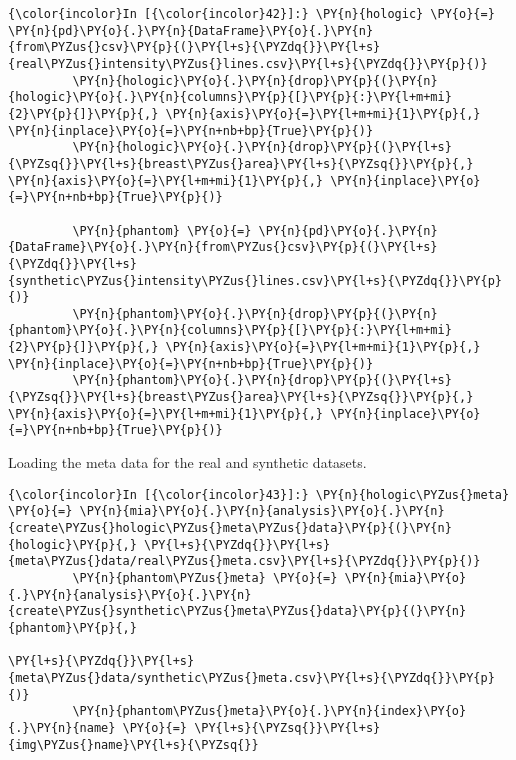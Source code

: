     \begin{Verbatim}[commandchars=\\\{\}]
{\color{incolor}In [{\color{incolor}42}]:} \PY{n}{hologic} \PY{o}{=} \PY{n}{pd}\PY{o}{.}\PY{n}{DataFrame}\PY{o}{.}\PY{n}{from\PYZus{}csv}\PY{p}{(}\PY{l+s}{\PYZdq{}}\PY{l+s}{real\PYZus{}intensity\PYZus{}lines.csv}\PY{l+s}{\PYZdq{}}\PY{p}{)}
         \PY{n}{hologic}\PY{o}{.}\PY{n}{drop}\PY{p}{(}\PY{n}{hologic}\PY{o}{.}\PY{n}{columns}\PY{p}{[}\PY{p}{:}\PY{l+m+mi}{2}\PY{p}{]}\PY{p}{,} \PY{n}{axis}\PY{o}{=}\PY{l+m+mi}{1}\PY{p}{,} \PY{n}{inplace}\PY{o}{=}\PY{n+nb+bp}{True}\PY{p}{)}
         \PY{n}{hologic}\PY{o}{.}\PY{n}{drop}\PY{p}{(}\PY{l+s}{\PYZsq{}}\PY{l+s}{breast\PYZus{}area}\PY{l+s}{\PYZsq{}}\PY{p}{,} \PY{n}{axis}\PY{o}{=}\PY{l+m+mi}{1}\PY{p}{,} \PY{n}{inplace}\PY{o}{=}\PY{n+nb+bp}{True}\PY{p}{)}

         \PY{n}{phantom} \PY{o}{=} \PY{n}{pd}\PY{o}{.}\PY{n}{DataFrame}\PY{o}{.}\PY{n}{from\PYZus{}csv}\PY{p}{(}\PY{l+s}{\PYZdq{}}\PY{l+s}{synthetic\PYZus{}intensity\PYZus{}lines.csv}\PY{l+s}{\PYZdq{}}\PY{p}{)}
         \PY{n}{phantom}\PY{o}{.}\PY{n}{drop}\PY{p}{(}\PY{n}{phantom}\PY{o}{.}\PY{n}{columns}\PY{p}{[}\PY{p}{:}\PY{l+m+mi}{2}\PY{p}{]}\PY{p}{,} \PY{n}{axis}\PY{o}{=}\PY{l+m+mi}{1}\PY{p}{,} \PY{n}{inplace}\PY{o}{=}\PY{n+nb+bp}{True}\PY{p}{)}
         \PY{n}{phantom}\PY{o}{.}\PY{n}{drop}\PY{p}{(}\PY{l+s}{\PYZsq{}}\PY{l+s}{breast\PYZus{}area}\PY{l+s}{\PYZsq{}}\PY{p}{,} \PY{n}{axis}\PY{o}{=}\PY{l+m+mi}{1}\PY{p}{,} \PY{n}{inplace}\PY{o}{=}\PY{n+nb+bp}{True}\PY{p}{)}
\end{Verbatim}

    Loading the meta data for the real and synthetic datasets.

    \begin{Verbatim}[commandchars=\\\{\}]
{\color{incolor}In [{\color{incolor}43}]:} \PY{n}{hologic\PYZus{}meta} \PY{o}{=} \PY{n}{mia}\PY{o}{.}\PY{n}{analysis}\PY{o}{.}\PY{n}{create\PYZus{}hologic\PYZus{}meta\PYZus{}data}\PY{p}{(}\PY{n}{hologic}\PY{p}{,} \PY{l+s}{\PYZdq{}}\PY{l+s}{meta\PYZus{}data/real\PYZus{}meta.csv}\PY{l+s}{\PYZdq{}}\PY{p}{)}
         \PY{n}{phantom\PYZus{}meta} \PY{o}{=} \PY{n}{mia}\PY{o}{.}\PY{n}{analysis}\PY{o}{.}\PY{n}{create\PYZus{}synthetic\PYZus{}meta\PYZus{}data}\PY{p}{(}\PY{n}{phantom}\PY{p}{,}
                                                                \PY{l+s}{\PYZdq{}}\PY{l+s}{meta\PYZus{}data/synthetic\PYZus{}meta.csv}\PY{l+s}{\PYZdq{}}\PY{p}{)}
         \PY{n}{phantom\PYZus{}meta}\PY{o}{.}\PY{n}{index}\PY{o}{.}\PY{n}{name} \PY{o}{=} \PY{l+s}{\PYZsq{}}\PY{l+s}{img\PYZus{}name}\PY{l+s}{\PYZsq{}}
\end{Verbatim}

